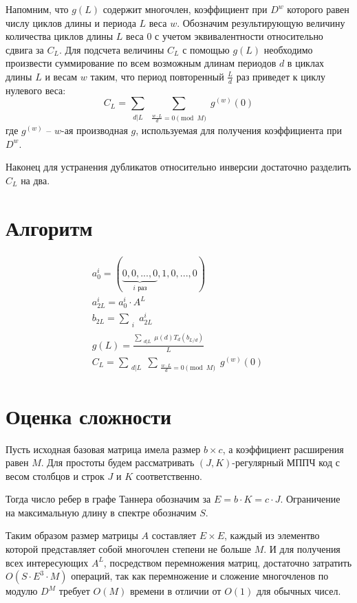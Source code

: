 \documentclass[specification,annotation,times]{itmo-student-thesis}
\begin{document}
Напомним, что $g(L)$ содержит многочлен, коэффициент при $D^w$ которого равен числу циклов длины и периода $L$ веса $w$.
Обозначим результирующую величину количества циклов длины $L$ веса 0 с учетом эквивалентности относительно сдвига за $C_L$.
Для подсчета величины $C_L$ с помощью $g(L)$ необходимо произвести суммирование по всем возможным длинам периодов $d$ в циклах
длины $L$ и весам $w$ таким, что период повторенный $\frac{L}{d}$ раз приведет к циклу нулевого веса:
\[
  C_L=\sum_{\substack{d|L}}\sum_{\substack{\frac{w \cdot L}{d} = 0 \pmod{M}}}g^{(w)}(0)
\]
где $g^{(w)}$ -- $w$-ая производная $g$, используемая для получения коэффициента при $D^w$.

Наконец для устранения дубликатов относительно инверсии достаточно разделить $C_L$ на два.

\section{Алгоритм}
\begin{eqnarray}
a_0^i=(\underbrace{0,0,...,0}_{i \text{ раз}},1,0,...,0) \label{aeq1} \\
a_{2L}^i=a_0^i \cdot A^L \label{aeq2} \\
b_{2L}=\sum_{\substack{i}}a_{2L}^i \label{aeq3} \\
  g(L) = \frac{\sum_{\substack{d|L}}\mu(d)T_d(b_{L/d})}{L} \label{aeq4} \\
  C_L=\sum_{\substack{d|L}}\sum_{\substack{\frac{w \cdot L}{d} = 0 \pmod{M}}}g^{(w)}(0) \label{aeq5} \
\end{eqnarray}

\section{Оценка сложности}

 Пусть исходная базовая  матрица имела размер $b \times c$, а коэффициент расширения равен $M$.
Для простоты будем рассматривать $(J,K)$-регулярный МППЧ код с 
весом столбцов и строк $J$ и $K$ соответственно. 

Тогда число ребер в графе Таннера обозначим за $E=b \cdot K = c \cdot J$.
Ограничение на максимальную длину в спектре обозначим $S$.

Таким образом размер матрицы $A$ составляет $E \times E$, каждый из элементво которой представляет
собой многочлен степени не больше $M$. И для получения
всех интересующих $A^L$, посредством перемножения матриц,
достаточно затратить $O(S \cdot E^3 \cdot M)$ операций, так как перемножение и сложение многочленов по модулю $D^M$
требует $O(M)$ времени в отличии от $O(1)$ для обычных чисел.
\end{document}

